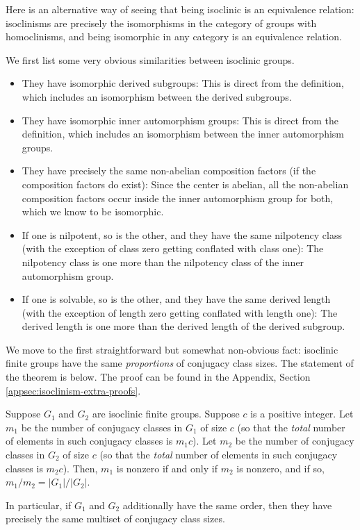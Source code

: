 \documentclass{ucetd}
\begin{document}
Here is an alternative way of seeing that being isoclinic is an
equivalence relation: isoclinisms are precisely the isomorphisms in
the category of groups with homoclinisms, and being isomorphic in any
category is an equivalence relation.

We first list some very obvious similarities between isoclinic groups.

\begin{itemize}
\item They have isomorphic derived subgroups: This is direct from the
  definition, which includes an isomorphism between the derived
  subgroups.
\item They have isomorphic inner automorphism groups: This is direct
  from the definition, which includes an isomorphism between the inner
  automorphism groups.
\item They have precisely the same non-abelian composition factors (if
  the composition factors do exist): Since the center is abelian, all
  the non-abelian composition factors occur inside the inner
  automorphism group for both, which we know to be isomorphic.
\item If one is nilpotent, so is the other, and they have the same
  nilpotency class (with the exception of class zero getting conflated
  with class one): The nilpotency class is one more than the
  nilpotency class of the inner automorphism group.
\item If one is solvable, so is the other, and they have the same
  derived length (with the exception of length zero getting conflated
  with length one): The derived length is one more than the derived
  length of the derived subgroup.
\end{itemize}

We move to the first straightforward but somewhat non-obvious fact:
isoclinic finite groups have the same {\em proportions} of conjugacy
class sizes. The statement of the theorem is below. The proof can be
found in the Appendix, Section \ref{appsec:isoclinism-extra-proofs}.

\begin{theorem}\label{isoclinic-same-proportions-conjugacy-class-sizes}
  Suppose $G_1$ and $G_2$ are isoclinic finite groups. Suppose $c$ is
  a positive integer. Let $m_1$ be the number of conjugacy classes in
  $G_1$ of size $c$ (so that the {\em total} number of elements in
  such conjugacy classes is $m_1c$). Let $m_2$ be the number of
  conjugacy classes in $G_2$ of size $c$ (so that the {\em total}
  number of elements in such conjugacy classes is $m_2c$). Then, $m_1$
  is nonzero if and only if $m_2$ is nonzero, and if so, $m_1/m_2 =
  |G_1|/|G_2|$.

  In particular, if $G_1$ and $G_2$ additionally have the same order,
  then they have precisely the same multiset of conjugacy class sizes.
\end{theorem}
\end{document}
